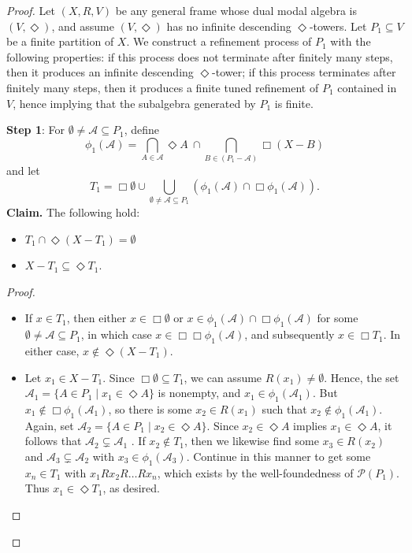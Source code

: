 \documentclass[10pt,a4paper]{amsart}
\begin{document}
\begin{proof}
    Let $(X,R,V)$ be any general frame whose dual modal algebra is $(V,\Diamond)$, and assume $(V,\Diamond)$ has no infinite descending $\Diamond$-towers. 
    Let $P_1 \subseteq V$ be a finite partition of $X$.
    We construct a refinement process of $P_1$ with the following properties: if this process does not terminate after finitely many steps, then it produces an infinite descending $\Diamond$-tower; if this process terminates after finitely many steps, then it produces a finite tuned refinement of $P_1$ contained in $V$, hence implying that the subalgebra generated by $P_1$ is finite.
    \par \textbf{Step 1}:
    For $\emptyset\neq\mathcal{A}\subseteq P_1$, define
    \[
    \phi_1 (\mathcal{A})= 
    \bigcap_{A \in \mathcal{A}} \Diamond A \ \cap
    \bigcap_{B \in (P_1-\mathcal{A})}\Box (X-B)
    \]
    and let
    \[
    T_1=\Box\emptyset \cup\bigcup_{\emptyset \neq\mathcal{A}\subseteq P_1}(\phi_1(\mathcal{A}) \cap \Box\phi_1(\mathcal{A})).
    \]
    \textbf{Claim.} The following hold:
    \begin{itemize}
    \item [(i)] $T_1 \cap \Diamond(X-T_1)=\emptyset$
    \item [(ii)] $X-T_1 \subseteq \Diamond T_1$.
    \end{itemize}

    \begin{proof}
    \begin{itemize}
    
  \item[(i)] If $x\in T_1$, then either $x \in \Box \emptyset$ or $x \in \phi_1(\mathcal{A}) \cap \Box\phi_1(\mathcal{A})$ for some $\emptyset\neq\mathcal{A}\subseteq P_1$, in which case
  $x \in \Box\Box\phi_1(\mathcal{A})$, and subsequently $x \in \Box T_1$.
    In either case, $x \notin \Diamond(X-T_1)$.
    
  \item[(ii)] Let $x_1 \in X-T_1$. Since $\Box \emptyset \subseteq T_1$, we can assume $R(x_1)\neq \emptyset$.
    Hence, the set $\mathcal{A}_1 = \{A \in P_1 \mid x_1 \in \Diamond A \}$ is nonempty, and $x_1 \in \phi_1(\mathcal{A}_1)$.
    But $x_1 \notin \Box \phi_1(\mathcal{A}_1)$, so there is some $x_2 \in R(x_1)$ such that $x_2 \notin \phi_1(\mathcal{A}_1)$.
    Again, set $\mathcal{A}_2=\{A \in P_1\mid x_2 \in \Diamond A\}$.
    Since $x_2 \in \Diamond A$ implies $x_1 \in \Diamond A$, it follows that
    $\mathcal{A}_2\subsetneq \mathcal{A}_1$ .
    If $x_2 \notin T_1$, then we likewise find some $x_3 \in R(x_2)$ and $\mathcal{A}_3\subsetneq \mathcal{A}_2$ with $x_3 \in \phi_1(\mathcal{A}_3)$. 
    Continue in this manner to get some $x_n \in T_1$ with 
    $x_1Rx_2R\dots Rx_n$, which exists by the well-foundedness of $\mathcal{P}(P_1)$. Thus $x_1 \in \Diamond T_1$, as desired.
    \end{itemize}


\end{proof}
\end{proof}
\end{document}
